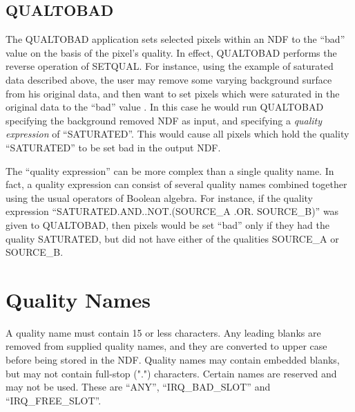 \subsection{QUALTOBAD}
The QUALTOBAD application sets selected pixels within an NDF to the ``bad''
value on the basis of the pixel's quality. In effect, QUALTOBAD performs the
reverse operation of SETQUAL. For instance, using the example of saturated data
described above, the user may remove some varying background surface from his
original data, and then want to set pixels which were saturated in the original
data to the ``bad'' value . In this case he would run QUALTOBAD specifying the
background removed NDF as input, and specifying a {\em quality expression} of
``SATURATED''. This would cause all pixels which hold the quality ``SATURATED''
to be set bad in the output NDF.

The ``quality expression'' can be more complex than a single quality name. In
fact, a quality expression can consist of several quality names combined
together using the usual operators of Boolean algebra. For instance, if the
quality expression ``SATURATED.AND..NOT.(SOURCE\_A .OR. SOURCE\_B)'' was given to
QUALTOBAD, then pixels would be set ``bad'' only if they had the quality
SATURATED, but did not have either of the qualities SOURCE\_A or SOURCE\_B.

\section{Quality Names}
A quality name must contain 15 or less characters. Any leading blanks are
removed from supplied quality names, and they are converted to upper case before
being stored in the NDF. Quality names may contain embedded blanks, but may not
contain full-stop (".") characters. Certain names are reserved and may not be
used. These are ``ANY'', ``IRQ\_BAD\_SLOT'' and ``IRQ\_FREE\_SLOT''.

